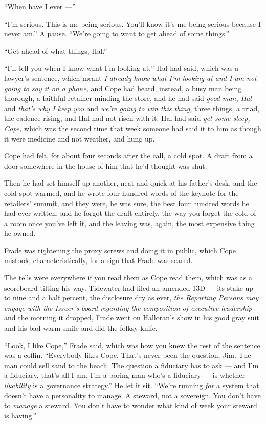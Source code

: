 \documentclass[11pt,openany]{book}
\newcommand{\scenebreak}{\par\vspace{0.5\baselineskip}\begin{center}\textasteriskcentered\quad\textasteriskcentered\quad\textasteriskcentered\end{center}\vspace{0.5\baselineskip}\par}
\begin{document}
``When have I ever ---''

``I'm serious. This is me being serious. You'll know it's me being serious because I never am.'' A pause. ``We're going to want to get ahead of some things.''

``Get ahead of what things, Hal.''

``I'll tell you when I know what I'm looking at,'' Hal had said, which was a lawyer's sentence, which meant \textit{I already know what I'm looking at and I am not going to say it on a phone,} and Cope had heard, instead, a busy man being thorough, a faithful retainer minding the store, and he had said \textit{good man, Hal} and \textit{that's why I keep you} and \textit{we're going to win this thing,} three things, a triad, the cadence rising, and Hal had not risen with it. Hal had said \textit{get some sleep, Cope,} which was the second time that week someone had said it to him as though it were medicine and not weather, and hung up.

Cope had felt, for about four seconds after the call, a cold spot. A draft from a door somewhere in the house of him that he'd thought was shut.

Then he had set himself up another, neat and quick at his father's desk, and the cold spot warmed, and he wrote four hundred words of the keynote for the retailers' summit, and they were, he was sure, the best four hundred words he had ever written, and he forgot the draft entirely, the way you forget the cold of a room once you've left it, and the leaving was, again, the most expensive thing he owned.


\scenebreak


Frade was tightening the proxy screws and doing it in public, which Cope mistook, characteristically, for a sign that Frade was scared.

The tells were everywhere if you read them as Cope read them, which was as a scoreboard tilting his way. Tidewater had filed an amended 13D --- its stake up to nine and a half percent, the disclosure dry as ever, \textit{the Reporting Persons may engage with the Issuer's board regarding the composition of executive leadership} --- and the morning it dropped, Frade went on Halloran's show in his good gray suit and his bad warm smile and did the folksy knife.

``Look, I like Cope,'' Frade said, which was how you knew the rest of the sentence was a coffin. ``Everybody likes Cope. That's never been the question, Jim. The man could sell sand to the beach. The question a fiduciary has to ask --- and I'm a fiduciary, that's all I am, I'm a boring man who's a fiduciary --- is whether \textit{likability} is a governance strategy.'' He let it sit. ``We're running \textit{for} a system that doesn't have a personality to manage. A steward, not a sovereign. You don't have to \textit{manage} a steward. You don't have to wonder what kind of week your steward is having.''
\end{document}
